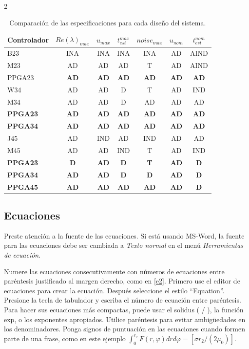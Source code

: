 \documentclass[5p,times,authoryear]{sciarticle}
\begin{document}
\begin{multicols}{2}
\begin{table}[t]
\centering
\caption{Comparación de las especificaciones para cada diseño del sistema. }
\label{tabladeseables}
\begin{tabular}{lcccccc}   \hline
Controlador  & $Re(\lambda)_{max}$  & $u_{max}$ & $t_{est}^{max}$ & $noise_{max}$ & $u_{nom}$ & $t_{est}^{nom}$  \\ \hline
B23 & INA & INA & INA & INA & AD & AIND \\
M23 & AD & AD & AD & T & AD & AIND \\
PPGA23 & \textbf{AD} & \textbf{AD}& \textbf{AD}&\textbf{AD} &\textbf{AD} & \textbf{AD}\\
 \hline
 W34 & AD & AD & D & T & AD & IND \\
 M34 & AD & AD & D & AD & AD & AD \\
 \textbf{PPGA23} & \textbf{AD} & \textbf{AD} & \textbf{AD} & \textbf{AD} & \textbf{AD} & \textbf{AD} \\
 \textbf{PPGA34} & \textbf{AD} & \textbf{AD} & \textbf{AD} & \textbf{AD} & \textbf{AD} & \textbf{AD} \\
  \hline
J45 & AD & IND & AD & IND & AD & AD \\
M45 & AD & AD & IND & T & AD & IND \\
\textbf{PPGA23} & \textbf{D} & \textbf{AD} & \textbf{D} & \textbf{T} & \textbf{AD} & \textbf{D} \\
\textbf{PPGA34} & \textbf{AD} & \textbf{AD} & \textbf{D} & \textbf{D} & \textbf{AD} & \textbf{D}  \\
\textbf{PPGA45} & \textbf{AD} & \textbf{AD} & \textbf{AD} & \textbf{AD} & \textbf{AD} & \textbf{D} \\
 \hline
\end{tabular}
\end{table}



\subsection{Ecuaciones}

Preste atención a la fuente de las ecuaciones. Si está usando MS-Word, la fuente para las ecuaciones debe ser cambiada a \emph{Texto normal} en el menú \emph{Herramientas de ecuación}.

Numere las ecuaciones consecutivamente con números de ecuaciones
entre paréntesis justificado al margen derecho, como en \eqref{e2}.
Primero use el editor de ecuaciones para crear la ecuación. Después
seleccione el estilo ``Equation''. Presione la tecla de tabulador y
escriba el número de ecuación entre paréntesis. Para hacer sus
ecuaciones más compactas, puede usar el solidus ( / ), la función
exp, o los exponentes apropiados. Utilice paréntesis para evitar
ambigüedades en los denominadores. Ponga signos de puntuación en las
ecuaciones cuando formen parte de una frase, como en este ejemplo
$\int_0^{r_2} F (r, \varphi ) dr d\varphi = [\sigma r_2 / (2 \mu_0 )]$.


\end{multicols}
\end{document}
